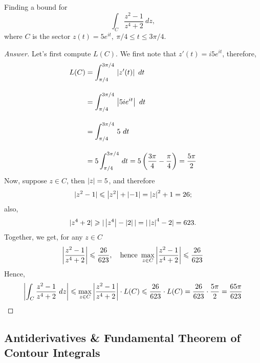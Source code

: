 \begin{example}
Finding a bound for
\[\int_C\frac{z^2 - 1}{z^4 + 2}\ dz,\]
where $C$ is the sector $z(t) = 5e^{it},\ \pi/4 \leq t \leq 3\pi/4$.
\end{example}
\begin{proof}[Answer]
Let's first compute $L(C)$. We first note that $z'(t) = i5e^{it}$, therefore,
\begin{align*}
L(C) &= \int_{\pi/4}^{3\pi/4}\,\left\lvert z'(t)\right\rvert\ dt\\[1em] 
 &= \int_{\pi/4}^{3\pi/4}\,\left\lvert5ie^{it}\right\rvert\ dt\\[1em]
 &= \int_{\pi/4}^{3\pi/4}\,5\ dt\\[1em]
 &= 5\int_{\pi/4}^{3\pi/4}\,dt = 5\left(\frac{3\pi}{4} - \frac{\pi}{4}\right) = \frac{5\pi}{2}
\end{align*}
Now, suppose $z \in C$, then $\left\lvert z\right\rvert = 5$, and therefore
\[|z^2 - 1| \leqslant \left\lvert z^2\right\rvert + \left\lvert-1\right\rvert = \left\lvert z\right\rvert^2 + 1 = 26;\]
also,
\[|z^4 + 2| \geqslant |\left\lvert z^4\right\rvert - \left\lvert2\right\rvert| = |\left\lvert z\right\rvert^4 - 2| = 623.\]
Together, we get, for any $z \in C$
\[\left\lvert\frac{z^2 - 1}{z^4 + 2}\right\rvert \leqslant \frac{26}{623},\quad \text{hence }\max_{z \in C}\left\lvert\frac{z^2 - 1}{z^4 + 2}\right\rvert \leqslant \frac{26}{623}\]
Hence, 
\[\left\lvert\int_C\frac{z^2 - 1}{z^4 + 2}\ dz\right\rvert \leqslant \max_{z \in C}\left\lvert\frac{z^2 - 1}{z^4 + 2}\right\rvert\cdot L(C) \leqslant \frac{26}{623}\cdot L(C) = \frac{26}{623}\cdot \frac{5\pi}{2} = \frac{65\pi}{623}\]
\end{proof}

\bigskip

\subsection{Antiderivatives \& Fundamental Theorem of Contour Integrals}

